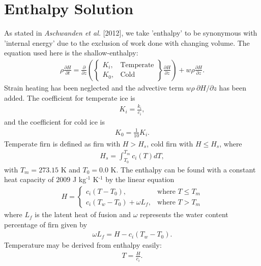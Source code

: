 \documentclass{article}%
\newcommand{\sups}[1]{\ensuremath{^{\textrm{#1}}}}
\begin{document}
\section{Enthalpy Solution}

As stated in \emph{Aschwanden et al.} [2012], we take 'enthalpy' to be synonymous with 'internal energy' due to the exclusion of work done with changing volume.  The equation used here is the shallow-enthalpy:
\begin{align*}
  \rho \frac{\partial H}{\partial t} = \frac{\partial}{\partial z} 
    \left( 
      \begin{Bmatrix}
        K_i, &\text{Temperate}\\
        K_0, &\text{Cold}
      \end{Bmatrix}
      \frac{\partial H}{\partial z} 
    \right) + w \rho \frac{\partial H}{\partial z}.
\end{align*}
Strain heating has been neglected and the advective term $w \rho\ \partial H / \partial z$ has been added.  The coefficient for temperate ice is 
\begin{align*}
  K_i = \frac{k_i}{c_i},
\end{align*}
and the coefficient for cold ice is
\begin{align*}
  K_0 = \frac{1}{10}K_i.
\end{align*}
Temperate firn is defined as firn with $H > H_s$, cold firn with $H \leq H_s$, where
\begin{align*}
  H_s = \int_{T_0}^{T_m}{c_i(T)}dT,
\end{align*}
with $T_m = 273.15$ K and $T_0 = 0.0$ K.  The enthalpy can be found with a constant heat capacity of $2009$ J kg\sups{-1} K\sups{-1} by the linear equation
\begin{align*}
  H = 
  \begin{cases}
    c_i(T - T_0), &\text{where } T \leq T_m\\
    c_i(T_w - T_0) + \omega L_f,  &\text{where } T > T_m
  \end{cases}
\end{align*}
where $L_f$ is the latent heat of fusion and $\omega$ represents the water content percentage of firn given by
\begin{align*}
  \omega L_f = H - c_i(T_w - T_0).
\end{align*}
Temperature may be derived from enthalpy easily:
\begin{align*}
  T = \frac{H}{c_i}.
\end{align*}
\end{document}
